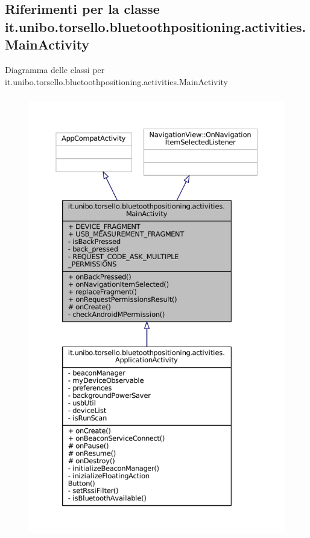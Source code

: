 \hypertarget{classit_1_1unibo_1_1torsello_1_1bluetoothpositioning_1_1activities_1_1MainActivity}{}\subsection{Riferimenti per la classe it.\+unibo.\+torsello.\+bluetoothpositioning.\+activities.\+Main\+Activity}
\label{classit_1_1unibo_1_1torsello_1_1bluetoothpositioning_1_1activities_1_1MainActivity}


Diagramma delle classi per it.\+unibo.\+torsello.\+bluetoothpositioning.\+activities.\+Main\+Activity
\nopagebreak
\begin{figure}[H]
\begin{center}
\leavevmode
\includegraphics[height=550pt]{classit_1_1unibo_1_1torsello_1_1bluetoothpositioning_1_1activities_1_1MainActivity__inherit__graph}
\end{center}
\end{figure}


